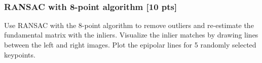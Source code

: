\documentclass[11pt]{article}
\begin{document}
    \begin{center}
    \end{center}
    { \hspace*{\fill} \\}
    
    \subsubsection{RANSAC with 8-point algorithm {[}10
pts{]}}\label{ransac-with-8-point-algorithm-10-pts}

Use RANSAC with the 8-point algorithm to remove outliers and re-estimate
the fundamental matrix with the inliers. Visualize the inlier matches by
drawing lines between the left and right images. Plot the epipolar lines
for 5 randomly selected keypoints.
\end{document}
